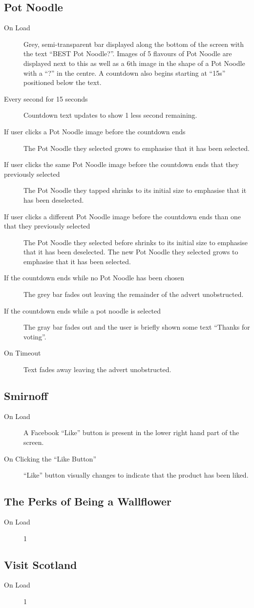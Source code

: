 \subsection{Pot Noodle}
	\begin{description}
		\item[On Load]{Grey, semi-transparent bar displayed along the bottom of the screen with the text ``BEST Pot Noodle?''. Images of 5 flavours of Pot Noodle are displayed next to this as well as a 6th image in the shape of a Pot Noodle with a ``?'' in the centre. A countdown also begins starting at ``15s'' positioned below the text.}
		\item[Every second for 15 seconds]{Countdown text updates to show 1 less second remaining.}
		\item[If user clicks a Pot Noodle image before the countdown ends]{The Pot Noodle they selected grows to emphasise that it has been selected.}		
		\item[If user clicks the same Pot Noodle image before the countdown ends that they previously selected]{The Pot Noodle they tapped shrinks to its initial size to emphasise that it has been deselected.}
		\item[If user clicks a different Pot Noodle image before the countdown ends than one that they previously selected]{The Pot Noodle they selected before shrinks to its initial size to emphasise that it has been deselected. The new Pot Noodle they selected grows to emphasise that it has been selected.}
		\item[If the countdown ends while no Pot Noodle has been chosen]{The grey bar fades out leaving the remainder of the advert unobstructed.}
		\item[If the countdown ends while a pot noodle is selected]{The gray bar fades out and the user is briefly shown some text ``Thanks for voting''.}
		\item[On Timeout]{Text fades away leaving the advert unobstructed.}
	\end{description}
\subsection{Smirnoff}
	\begin{description}
		\item[On Load]{A Facebook ``Like'' button is present in the lower right hand part of the screen.}
		\item[On Clicking the ``Like Button'']{``Like'' button visually changes to indicate that the product has been liked.}
	\end{description}
\subsection{The Perks of Being a Wallflower}
	\begin{description}
		\item[On Load]{1}
	\end{description}
\subsection{Visit Scotland}
	\begin{description}
		\item[On Load]{1}
	\end{description}